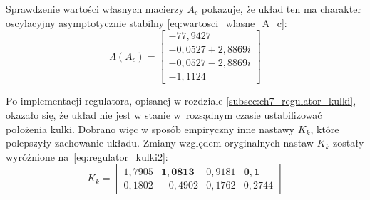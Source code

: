 Sprawdzenie wartości własnych macierzy $A_c$ pokazuje, że układ ten ma charakter oscylacyjny asymptotycznie stabilny \eqref{eq:wartosci_wlasne_A_c}:
\begin{equation}
    \Lambda(A_c) = \begin{bmatrix}
     -77,9427 \\
     -0,0527 + 2,8869i \\
     -0,0527 - 2,8869i \\
     -1,1124
    \end{bmatrix} \label{eq:wartosci_wlasne_A_c}
\end{equation}

Po implementacji regulatora, opisanej w rozdziale \ref{subsec:ch7_regulator_kulki}, okazało się, że układ nie jest w stanie w~rozsądnym czasie ustabilizować położenia kulki. Dobrano więc w sposób empiryczny inne nastawy $K_k$, które polepszyły zachowanie układu. Zmiany względem oryginalnych nastaw $K_k$ zostały wyróżnione na~\eqref{eq:regulator_kulki2}:
\begin{equation}
K_k = \begin{bmatrix}
    1,7905 &  \mathbf{1,0813} &  0,9181 &  \mathbf{0,1} \\
    0,1802 & -0,4902 &  0,1762 &  0,2744
\end{bmatrix} \label{eq:regulator_kulki2}
\end{equation}

